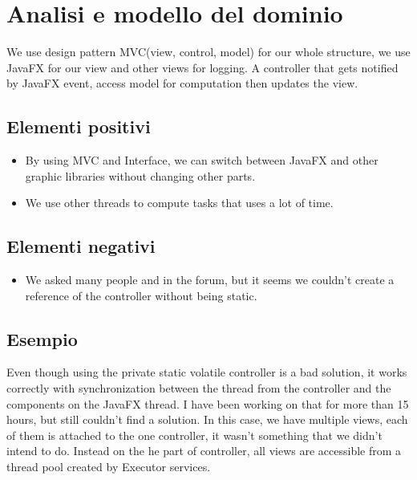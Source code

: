 \documentclass[a4paper,12pt]{report}
\begin{document}
\section{Analisi e modello del dominio}
We use design pattern MVC(view, control, model) for our whole structure, we use JavaFX for our view and other views for logging.  
A controller that gets notified by JavaFX event, access model for computation then updates the view.  


\subsection*{Elementi positivi}
\begin{itemize}
	\item By using MVC and Interface, we can switch between JavaFX and other graphic libraries without changing other parts. 
    \item We use other threads to compute tasks that uses a lot of time.
\end{itemize}

\subsection*{Elementi negativi}
\begin{itemize}
    \item We asked many people and in the forum, but it seems we couldn't create a reference of the controller without being static.
\end{itemize}

\subsection*{Esempio}
Even though using the private static volatile controller is a bad solution, it works correctly with synchronization between the thread from the controller and the components on the JavaFX thread. 
I have been working on that for more than 15 hours, but still couldn't find a solution. In this case, we have multiple views, each of them is attached to the one controller, it wasn't something that we didn't intend to do.
Instead on the he part of controller, all views are accessible from a thread pool created by Executor services. 
\end{document}
